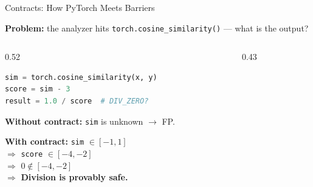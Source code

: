 \documentclass[aspectratio=169]{beamer}
\begin{document}
\begin{frame}[fragile]{Contracts: How PyTorch Meets Barriers}
\begin{center}
\textbf{Problem:} the analyzer hits \texttt{torch.cosine\_similarity()} --- what is the output?
\end{center}

\vspace{0.5em}
\begin{columns}[T]
\begin{column}{0.52\textwidth}
\begin{lstlisting}[language=Python]
sim = torch.cosine_similarity(x, y)
score = sim - 3
result = 1.0 / score  # DIV_ZERO?
\end{lstlisting}

\vspace{0.3em}
\textbf{Without contract:} \texttt{sim} is unknown $\to$ FP.

\vspace{0.3em}
\textbf{With contract:} \texttt{sim} $\in [-1, 1]$\\
$\Rightarrow$ \texttt{score} $\in [-4, -2]$\\
$\Rightarrow$ $0 \notin [-4, -2]$\\
$\Rightarrow$ \textcolor{safe}{\textbf{Division is provably safe.}}
\end{column}
\begin{column}{0.43\textwidth}
\centering
{}
\end{column}
\end{columns}
\end{frame}
\end{document}
